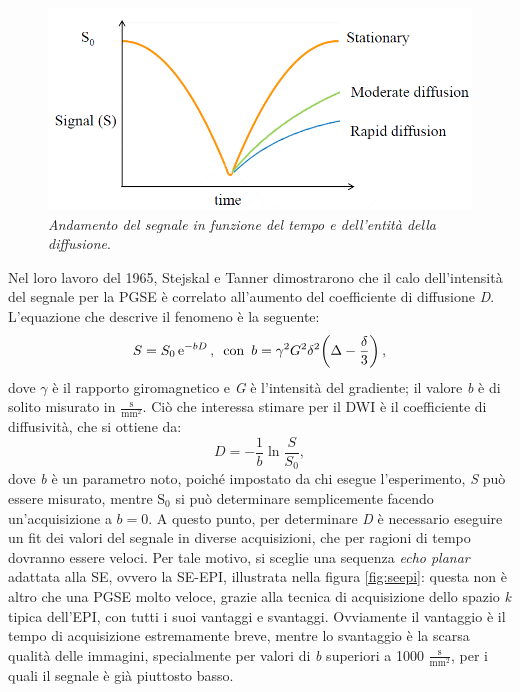 \documentclass{report}
\newcommand{\figref}[1]{figura \ref{#1}}
\numberwithin{equation}{section}
\numberwithin{figure}{section}
\begin{document}
\begin{figure}[htp]
\centering
\includegraphics[scale=0.65]{immagini/diff.png}
\caption{\label{fig:diff} \textit{Andamento del segnale in funzione del tempo e dell'entità della diffusione}.}
\end{figure}

Nel loro lavoro del 1965, Stejskal e Tanner dimostrarono che il calo dell'intensità del segnale per la PGSE è correlato all'aumento del coefficiente di diffusione \textit{D}. L'equazione che descrive il fenomeno è la seguente:
\begin{equation}
    S = S_0\,\mathrm{e}^{-bD}\,,\hspace{5 pt} \text{con} \hspace{5 pt} b = \gamma^2 G^2 \delta^2 \bigg( \Delta - \frac{\delta}{3} \bigg)\,,
\end{equation}
dove $\gamma$ è il rapporto giromagnetico e \textit{G} è l'intensità del gradiente; il valore \textit{b} è di solito misurato in $\mathrm{\frac{s}{mm^2}}$. Ciò che interessa stimare per il DWI è il coefficiente di diffusività, che si ottiene da:
\begin{equation}
    D = -\frac{1}{b} \ln{\frac{S}{S_0}},
\end{equation}
dove \textit{b} è un parametro noto, poiché impostato da chi esegue l'esperimento, \textit{S} può essere misurato, mentre $\mathrm{S_0}$ si può determinare semplicemente facendo un'acquisizione a $b=0$. A questo punto, per determinare \textit{D} è necessario eseguire un fit dei valori del segnale in diverse acquisizioni, che per ragioni di tempo dovranno essere veloci. Per tale motivo, si sceglie una sequenza \textit{echo planar} adattata alla SE, ovvero la SE-EPI, illustrata nella \figref{fig:seepi}: questa non è altro che una PGSE molto veloce, grazie alla tecnica di acquisizione dello spazio \textit{k} tipica dell'EPI, con tutti i suoi vantaggi e svantaggi. Ovviamente il vantaggio è il tempo di acquisizione estremamente breve, mentre lo svantaggio è la scarsa qualità delle immagini, specialmente per valori di \textit{b} superiori a 1000 $\mathrm{\frac{s}{mm^2}}$, per i quali il segnale è già piuttosto basso.
\end{document}
